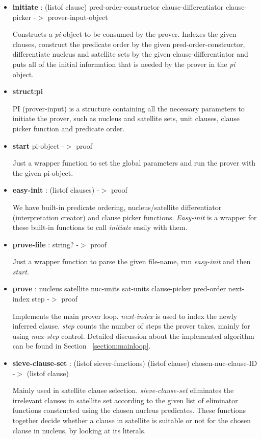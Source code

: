 \documentclass[11pt]{report}
\begin{document}
\begin{appendices}
\begin{itemize}
 \item \textbf{initiate} : (listof clause) pred-order-constructor clause-differentiator clause-picker -$>$ prover-input-object

Constructs a \textit{pi} object to be consumed by the prover. Indexes the given clauses, construct the predicate order by the given pred-order-constructor, differentiate nucleus and satellite sets by the given clause-differentiator and puts all of the initial information that is needed by the prover in the \textit{pi} object.

 \item \textbf{struct:pi}

PI (prover-input) is a structure containing all the necessary parameters to initiate the prover, such as nucleus and satellite sets, unit clauses, clause picker function and predicate order.

 \item \textbf{start} pi-object -$>$ proof

Just a wrapper function to set the global parameters and run the prover with the given pi-object.

 \item \textbf{easy-init} : (listof clauses) -$>$ proof

We have built-in predicate ordering, nucleus/satellite differentiator (interpretation creator) and clause picker functions. \textit{Easy-init} is a wrapper for these built-in functions to call \textit{initiate} easily with them.

 \item \textbf{prove-file} : string? -$>$ proof

Just a wrapper function to parse the given file-name, run \textit{easy-init} and then \textit{start}.

 \item \textbf{prove} : nucleus satellite nuc-units sat-units clause-picker pred-order next-index step -$>$ proof

Implements the main prover loop. \textit{next-index} is used to index the newly inferred clause. \textit{step} counts the number of steps the prover takes, mainly for using \textit{max-step} control. Detailed discussion about the implemented algorithm can be found in Section ~\ref{section:mainloop}.

 \item \textbf{sieve-clause-set} : (listof siever-functions) (listof clause) chosen-nuc-clause-ID -$>$ (listof clause)

Mainly used in satellite clause selection. \textit{sieve-clause-set} eliminates the irrelevant clauses in satellite set according to the given list of eliminator functions constructed using the chosen nucleus predicates. These functions together decide whether a clause in satellite is suitable or not for the chosen clause in nucleus, by looking at its literals.


\end{itemize}
\end{appendices}
\end{document}
